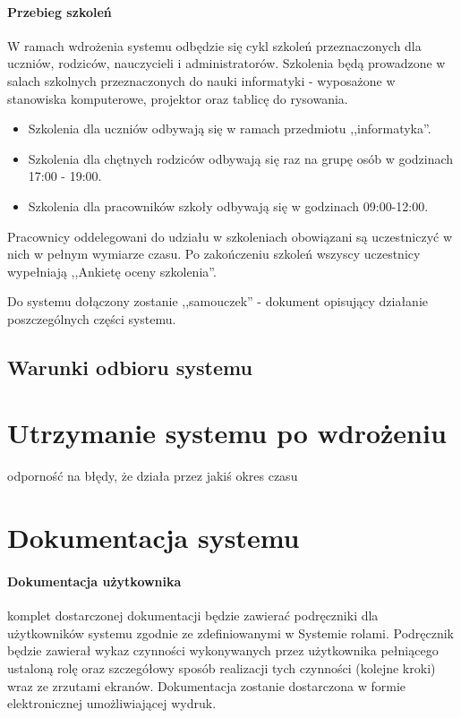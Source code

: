 \documentclass{article}
\begin{document}
\paragraph{Przebieg szkoleń}
W ramach wdrożenia systemu odbędzie się cykl szkoleń przeznaczonych dla uczniów, rodziców, nauczycieli i administratorów. Szkolenia będą prowadzone w salach szkolnych przeznaczonych do nauki informatyki - wyposażone w stanowiska komputerowe, projektor oraz tablicę do rysowania.
\begin{itemize}
\item Szkolenia dla uczniów odbywają się w ramach przedmiotu ,,informatyka''.
\item Szkolenia dla chętnych rodziców odbywają się raz na grupę osób w godzinach 17:00 - 19:00.
\item Szkolenia dla pracowników szkoły odbywają się w godzinach 09:00-12:00.
\end{itemize}
Pracownicy oddelegowani do udziału w szkoleniach obowiązani są uczestniczyć w nich w pełnym wymiarze czasu. Po zakończeniu szkoleń wszyscy uczestnicy wypełniają ,,Ankietę oceny szkolenia''.

Do systemu dołączony zostanie ,,samouczek'' - dokument opisujący działanie poszczególnych części systemu.

\subsection{Warunki odbioru systemu}
\section{Utrzymanie systemu po wdrożeniu}
odporność na błędy, że działa przez jakiś okres czasu

\section{Dokumentacja systemu}
\paragraph{Dokumentacja użytkownika} komplet dostarczonej dokumentacji będzie zawierać podręczniki dla użytkowników systemu zgodnie ze zdefiniowanymi w Systemie rolami. Podręcznik będzie zawierał wykaz czynności wykonywanych przez użytkownika pełniącego ustaloną rolę oraz szczegółowy sposób realizacji tych czynności (kolejne kroki) wraz ze zrzutami ekranów. Dokumentacja zostanie dostarczona w formie elektronicznej umożliwiającej wydruk.
\end{document}
